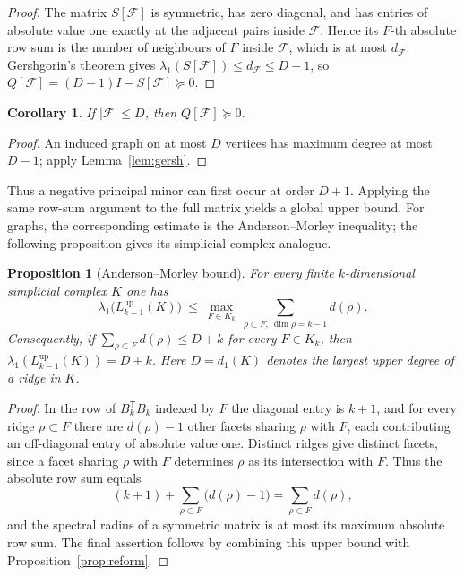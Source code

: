 \documentclass[11pt,reqno]{amsart}
\numberwithin{equation}{section}
\theoremstyle{plain}
\newtheorem{proposition}[theorem]{Proposition}
\newtheorem{corollary}[theorem]{Corollary}
\theoremstyle{definition}
\newcommand{\Lup}{L^{\mathrm{up}}}
\newcommand{\T}{\mathsf{T}}
\newcommand{\Fset}{\mathcal F}
\begin{document}
\begin{proof}
The matrix $S[\Fset]$ is symmetric, has zero diagonal, and has entries of absolute value one
exactly at the adjacent pairs inside $\Fset$. Hence its $F$-th absolute row sum is the number of
neighbours of $F$ inside $\Fset$, which is at most $d_{\Fset}$. Gershgorin's theorem gives
$\lambda_1(S[\Fset])\le d_{\Fset}\le D-1$, so
$Q[\Fset]=(D-1)I-S[\Fset]\succeq0$.
\end{proof}

\begin{corollary}\label{cor:small}
If $|\Fset|\le D$, then $Q[\Fset]\succeq0$.
\end{corollary}

\begin{proof}
An induced graph on at most $D$ vertices has maximum degree at most $D-1$; apply
Lemma~\ref{lem:gersh}.
\end{proof}

Thus a negative principal minor can first occur at order $D+1$. Applying the same row-sum
argument to the full matrix yields a global upper bound. For graphs, the corresponding estimate
is the Anderson--Morley inequality; the following proposition gives its simplicial-complex
analogue.

\begin{proposition}[Anderson--Morley bound]\label{prop:AM}
For every finite $k$-dimensional simplicial complex $K$ one has
\[
  \lambda_1\bigl(\Lup_{k-1}(K)\bigr)\ \le\ \max_{F\in K_k}\ \sum_{\rho\subset F,\ \dim\rho=k-1} d(\rho).
\]
Consequently, if $\sum_{\rho\subset F}d(\rho)\le D+k$ for every $F\in K_k$, then
$\lambda_1(\Lup_{k-1}(K))=D+k$.
Here $D=d_1(K)$ denotes the largest upper degree of a ridge in $K$.
\end{proposition}

\begin{proof}
In the row of $B_k^{\T}B_k$ indexed by $F$ the diagonal entry is $k+1$, and for every ridge
$\rho\subset F$ there are $d(\rho)-1$ other facets sharing $\rho$ with $F$, each contributing an
off-diagonal entry of absolute value one. Distinct ridges give distinct facets, since a facet
sharing $\rho$ with $F$ determines $\rho$ as its intersection with $F$. Thus the absolute row sum
equals
\[
  (k+1)+\sum_{\rho\subset F}\bigl(d(\rho)-1\bigr)=\sum_{\rho\subset F}d(\rho),
\]
and the spectral radius of a symmetric matrix is at most its maximum absolute row sum. The final
assertion follows by combining this upper bound with Proposition~\ref{prop:reform}.
\end{proof}
\end{document}
